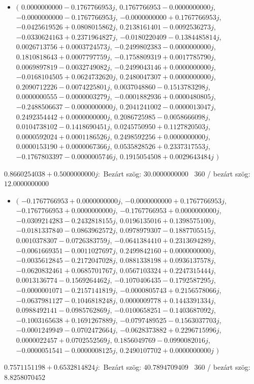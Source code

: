 \documentclass[14pt,a4paper]{article}
\begin{document}
\begin{itemize}
\item
$\big($
$0.0000000000-0.1767766953j$, $0.1767766953-0.0000000000j$, $-0.0000000000-0.1767766953j$, $-0.0000000000+0.1767766953j$, $-0.0425619526+0.0808015862j$, $0.2138161401-0.0092536273j$, $-0.0330624163+0.2371964827j$, $-0.0180220409-0.1384485814j$, $0.0026713756+0.0003724573j$, $-0.2499802383-0.0000000000j$, $0.1810818643+0.0007797759j$, $-0.1758809319+0.0017785790j$, $0.0069897819-0.0032749082j$, $-0.2499043146+0.0000000000j$, $-0.0168104505+0.0624732620j$, $0.2480047307+0.0000000000j$, $0.2090712226-0.0074225801j$, $0.0037048860-0.1513783298j$, $0.0000000555-0.0000003279j$, $-0.0001882936+0.0000480805j$, $-0.2488506637-0.0000000000j$, $0.2041241002-0.0000013047j$, $0.2492354442+0.0000000000j$, $0.2086725985-0.0058666098j$, $0.0104738102-0.1418690451j$, $0.0245750950+0.1127820503j$, $0.0000592024+0.0001186526j$, $0.2498592256+0.0000000000j$, $0.0000153190+0.0000067366j$, $0.0535828526+0.2337317553j$, $-0.1767803397-0.0000005746j$, $0.1915054508+0.0029643484j$
$\big)$
\end{itemize}
$0.8660254038+0.5000000000j$:\
Bezárt szög: $30.0000000000$ \
360 / bezárt szög: $12.0000000000$\
\begin{itemize}
\item
$\big($
$-0.1767766953+0.0000000000j$, $-0.0000000000+0.1767766953j$, $-0.1767766953+0.0000000000j$, $-0.1767766953+0.0000000000j$, $-0.0309214283-0.2432818155j$, $0.0196135016+0.1398575100j$, $-0.0181337840-0.0863962572j$, $0.0978979307-0.1887705515j$, $0.0010378307-0.0726383759j$, $-0.0641384410+0.2313694289j$, $-0.0061669351-0.0011027697j$, $0.2499842160+0.0000000000j$, $-0.0035612845-0.2172047028j$, $0.0881338198+0.0936137578j$, $-0.0620832461+0.0685701767j$, $0.0567103324+0.2247315444j$, $0.0013136774-0.1569264462j$, $-0.1070406435-0.1792587295j$, $-0.0000001071-0.2157141819j$, $-0.0000805743+0.2156578066j$, $-0.0637981127-0.1046818248j$, $0.0000009778+0.1443391334j$, $0.0988492141-0.0985762869j$, $-0.0100658251-0.1403687092j$, $-0.1003165638+0.1691267889j$, $-0.0797489525-0.1563037703j$, $-0.0001249949-0.0702472664j$, $-0.0628373882+0.2296715996j$, $0.0000022457+0.0702552569j$, $0.1856049769-0.0990082016j$, $-0.0000051541-0.0000008125j$, $0.2490107702+0.0000000000j$
$\big)$
\end{itemize}
$0.7571151198+0.6532814824j$:\
Bezárt szög: $40.7894709409$ \
360 / bezárt szög: $8.8258070452$\
\end{document}
